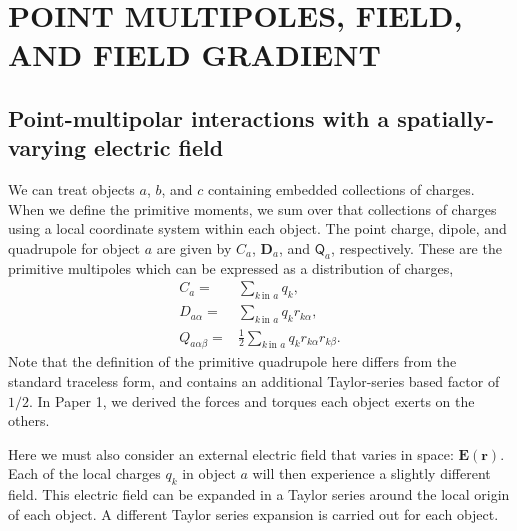 %
%
%
%
%
%
%
%

%
%

\chapter{POINT MULTIPOLES, FIELD, AND FIELD GRADIENT }

\section{Point-multipolar interactions with a spatially-varying electric field}

We can treat objects $a$, $b$, and $c$ containing embedded collections
of charges. When we define the primitive moments, we sum over that
collections of charges using a local coordinate system within each
object.  The point charge, dipole, and quadrupole for object $a$ are
given by $C_a$, $\mathbf{D}_a$, and $\mathsf{Q}_a$, respectively.
These are the primitive multipoles which can be expressed as a
distribution of charges,
\begin{align}
C_a =&\sum_{k \, \text{in }a} q_k , \label{eq:charge} \\
D_{a\alpha} =&\sum_{k \, \text{in }a} q_k r_{k\alpha}, \label{eq:dipole}\\
Q_{a\alpha\beta} =& \frac{1}{2} \sum_{k \, \text{in }  a} q_k
r_{k\alpha}  r_{k\beta} . \label{eq:quadrupole}
\end{align}
Note that the definition of the primitive quadrupole here differs from
the standard traceless form, and contains an additional Taylor-series
based factor of $1/2$.  In Paper 1, we derived the forces and torques
each object exerts on the others.

Here we must also consider an external electric field that varies in
space: $\mathbf E(\mathbf r)$.  Each of the local charges $q_k$ in
object $a$ will then experience a slightly different field.  This
electric field can be expanded in a Taylor series around the local
origin of each object.  A different Taylor series expansion is carried
out for each object.

